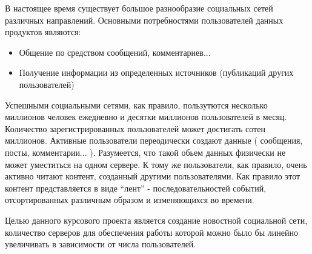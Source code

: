 \Introduction

В настоящее время существует большое разнообразие социальных сетей различных направлений. Основными потребностями пользователей данных продуктов являются:
\begin{itemize}
\item Общение по средством сообщений, комментариев...
\item Получение информации из определенных источников (публикаций других пользователей)
\end{itemize}

Успешными социальными сетями, как правило, пользутются несколько миллионов человек ежедневно и десятки миллионов пользователей в месяц. 
Количество зарегистрированных пользователей может достигать сотен миллионов.
Активные пользователи переодически создают данные ( сообщения, посты, комментарии... ).
Разумеется, что такой обьем данных физически не может уместиться на одном сервере.
К тому же пользователи, как правило, очень активно читают контент,
созданный другими пользователями.
Как правило этот контент представляется в виде ``лент'' - последовательностей событий, отсортированных различным образом и изменяющихся во времени.

Целью данного курсового проекта является создание новостной социальной сети,
количество серверов для обеспечения работы которой 
можно было бы линейно увеличивать в зависимости от числа пользователей.



